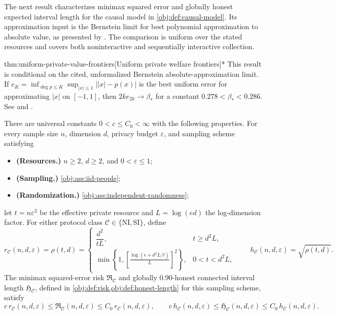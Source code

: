 \documentclass[11pt]{article}
\begin{document}
The next result characterizes minimax squared error and globally honest expected interval length for the causal model in \cref{obj:def:causal-model}. Its approximation input is the Bernstein limit for best polynomial approximation to absolute value, as presented by \citet[Section 3.1, p.~8]{CaiLow2011Nonsmooth}. The comparison is uniform over the stated resources and covers both noninteractive and sequentially interactive collection.

\begin{theoremv}{thm:uniform-private-value-frontiers}[Uniform private welfare frontiers]*
This result is conditional on the cited, unformalized Bernstein absolute-approximation limit. If \(e_K=\inf_{\deg p\le K}\sup_{|x|\le1}\lvert |x|-p(x)\rvert\) is the best uniform error for approximating \(|x|\) on \([-1,1]\), then \(2k e_{2k}\to\beta_*\) for a constant \(0.278<\beta_*<0.286\). See \citet[Section 3.1]{CaiLow2011Nonsmooth} and \citet{Bernstein1913}.

There are universal constants \(0<c\le C_0<\infty\) with the following properties. For every sample size \(n\), dimension \(d\), privacy budget \(\varepsilon\), and sampling scheme satisfying
\begin{itemize}
\item \textbf{(Resources.)} \(n\ge2\), \(d\ge2\), and \(0<\varepsilon\le1\);
\item \textbf{(Sampling.)} \cref{obj:ass:iid-people};
\item \textbf{(Randomization.)} \cref{obj:ass:independent-randomness};
\end{itemize}
let \(t=n\varepsilon^2\) be the effective private resource and \(L=\log(ed)\) the log-dimension factor. For either protocol class \(\mathcal C\in\{\mathrm{NI},\mathrm{SI}\}\), define
\[
r_{\mathcal C}(n,d,\varepsilon)=\rho(t,d)=
\begin{cases}
\dfrac{d^2}{tL},&t\ge d^2L,\\[4pt]
\displaystyle\min\left\{1,
\left[\frac{\log(e+d^2L/t)}{L}\right]^2\right\},
&0<t<d^2L,
\end{cases}
\qquad
h_{\mathcal C}(n,d,\varepsilon)=\sqrt{\rho(t,d)}.
\]
The minimax squared-error risk \(\mathfrak R_{\mathcal C}\) and globally \(0.90\)-honest connected interval length \(\mathfrak H_{\mathcal C}\), defined in \cref{obj:def:risk,obj:def:honest-length} for this sampling scheme, satisfy
\[
c\,r_{\mathcal C}(n,d,\varepsilon)
\le \mathfrak R_{\mathcal C}(n,d,\varepsilon)
\le C_0\,r_{\mathcal C}(n,d,\varepsilon),
\qquad
c\,h_{\mathcal C}(n,d,\varepsilon)
\le \mathfrak H_{\mathcal C}(n,d,\varepsilon)
\le C_0\,h_{\mathcal C}(n,d,\varepsilon).
\]


\end{theoremv}
\end{document}
